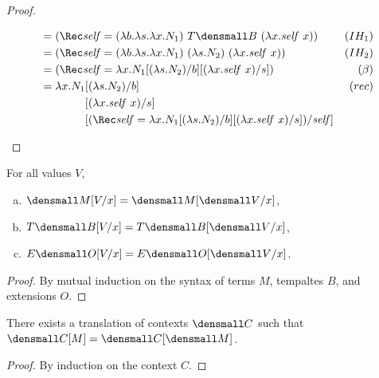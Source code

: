 \begin{proof}
\begin{enumerate}[(a)]
\begin{itemize}
\begin{align*}
        &=
        (\Rec \mathit{self}
        = (\lambda b. \lambda s. \lambda x. N_1)
        ~ T\den{B}
        ~ (\lambda x. \mathit{self} ~ x))
        &(IH_1)
        \\
        &=
        (\Rec \mathit{self}
        = (\lambda b. \lambda s. \lambda x. N_1)
        ~ (\lambda s. N_2)
        ~ (\lambda x. \mathit{self} ~ x))
        &(IH_2)
        \\
        &=
        (\Rec \mathit{self}
        = \lambda x.N_1\subst{b}{(\lambda s.N_2)}\subst{s}{(\lambda x.\mathit{self}~x)})
        &(\beta)
        \\
        &=
        \begin{aligned}[t]
          \lambda x.
          N_1
          &\subst{b}{(\lambda s.N_2)}
          \\
          &\subst{s}{(\lambda x.\mathit{self}~x)}
          \\
          &\subst
          {\mathit{self}}
          {
            (\Rec \mathit{self}
            =
            \lambda x.N_1\subst{b}{(\lambda s.N_2)}\subst{s}{(\lambda x.\mathit{self}~x)})
          }
        \end{aligned}
        &(rec)
      \end{align*}
    \end{itemize}
  \end{enumerate}
\end{proof}

\begin{lemma}[Substitution]
  \label{thm:substitution-translation}
  For all values $V$,
  \begin{enumerate}[(a)]
  \item $\den{M\subst{x}{V}} = \den{M}\subst{x}{\den{V}}$,
  \item $T\den{B\subst{x}{V}} = T\den{B}\subst{x}{\den{V}}$,
  \item $E\den{O\subst{x}{V}} = E\den{O}\subst{x}{\den{V}}$.
  \end{enumerate}
\end{lemma}
\begin{proof}
  By mutual induction on the syntax of terms $M$, tempaltes $B$, and extensions $O$.
\end{proof}

\begin{lemma}[Compositionality]
  \label{thm:compositional-translation}

  There exists a translation of contexts $\den{C}$ such that
  $\den{C[M]} = \den{C}{[\den{M}]}$.
\end{lemma}
\begin{proof}
  By induction on the context $C$.
\end{proof}

